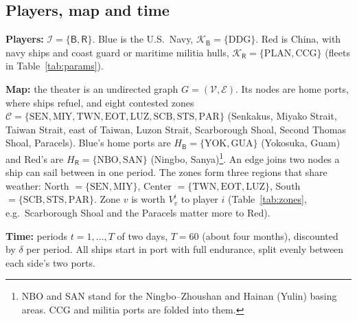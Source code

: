 \documentclass[10pt]{article}
\newcommand{\I}{\mathcal{I}}
\newcommand{\V}{\mathcal{V}}
\newcommand{\E}{\mathcal{E}}
\newcommand{\C}{\mathcal{C}}
\newcommand{\K}{\mathcal{K}}
\newcommand{\1}{\mathbf{1}}
\newcommand{\B}{\mathsf{B}}
\newcommand{\Rd}{\mathsf{R}}
\begin{document}
\subsection{Players, map and time}\label{sec:setup}
\textbf{Players:} $\I=\{\B,\Rd\}$. Blue is the U.S.\ Navy, $\K_\B=\{\text{DDG}\}$. Red is China, with navy ships and
coast guard or maritime militia hulls, $\K_\Rd=\{\text{PLAN},\text{CCG}\}$ (fleets in Table~\ref{tab:params}).

\textbf{Map:} the theater is an undirected graph $G=(\V,\E)$. Its nodes are home
ports, where ships refuel, and eight contested zones
$\C=\{\text{SEN},\text{MIY},\text{TWN},\text{EOT},\text{LUZ},\text{SCB},\text{STS},\text{PAR}\}$ (Senkakus, Miyako
Strait, Taiwan Strait, east of Taiwan, Luzon Strait, Scarborough Shoal, Second Thomas Shoal, Paracels). Blue's
home ports are $H_\B=\{\text{YOK},\text{GUA}\}$ (Yokosuka, Guam) and Red's are $H_\Rd=\{\text{NBO},\text{SAN}\}$
(Ningbo, Sanya)\footnote{NBO and SAN stand for the Ningbo--Zhoushan and Hainan (Yulin) basing areas. CCG and militia ports are folded into them.}. An edge joins two nodes a ship can sail between in
one period. The zones form three regions that share weather: North $=\{\text{SEN},\text{MIY}\}$, Center
$=\{\text{TWN},\text{EOT},\text{LUZ}\}$, South $=\{\text{SCB},\text{STS},\text{PAR}\}$. Zone $v$ is worth $V^i_v$
to player $i$ (Table~\ref{tab:zones}, e.g.\ Scarborough Shoal and the Paracels matter more to Red).

\textbf{Time:} periods $t=1,\dots,T$ of two days, $T=60$ (about four months), discounted by $\delta$ per period. All ships start in port with full endurance, split evenly between each side's two ports.
\end{document}
